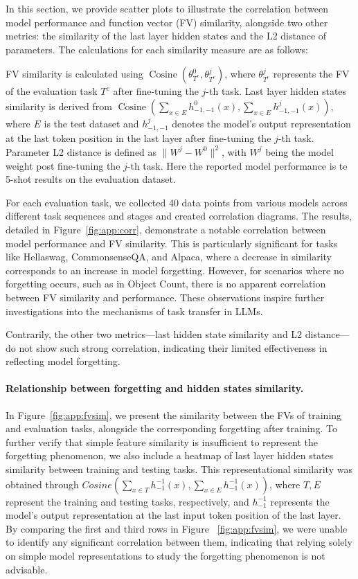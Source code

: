 In this section, we provide scatter plots to illustrate the correlation between model performance and function vector (FV) similarity, alongside two other metrics: the similarity of the last layer hidden states and the L2 distance of parameters. The calculations for each similarity measure are as follows:

FV similarity is calculated using \(\operatorname{Cosine}(\theta_{T^e}^0, \theta_{T^e}^j)\), where \(\theta_{T^e}^j\) represents the FV of the evaluation task \(T^e\) after fine-tuning the \(j\)-th task.
Last layer hidden states similarity is derived from \(\operatorname{Cosine}\left(\sum_{x \in E} h^0_{-1,-1}(x), \sum_{x \in E} h^j_{-1,-1}(x)\right)\), where \(E\) is the test dataset and \(h^j_{-1,-1}\) denotes the model's output representation at the last token position in the last layer after fine-tuning the \(j\)-th task.
Parameter L2 distance is defined as \(\|W^j - W^0\|^2\), with \(W^j\) being the model weight post fine-tuning the \(j\)-th task. Here the reported model performance is te 5-shot results on the evaluation dataset.

For each evaluation task, we collected 40 data points from various models across different task sequences and stages and created correlation diagrams. The results, detailed in Figure~\ref{fig:app:corr}, demonstrate a notable correlation between model performance and FV similarity. This is particularly significant for tasks like Hellaswag, CommonsenseQA, and Alpaca, where a decrease in similarity corresponds to an increase in model forgetting. However, for scenarios where no forgetting occurs, such as in Object Count, there is no apparent correlation between FV similarity and performance. These observations inspire further investigations into the mechanisms of task transfer in LLMs.

Contrarily, the other two metrics—last hidden state similarity and L2 distance—do not show such strong correlation, indicating their limited effectiveness in reflecting model forgetting.




\paragraph{Relationship between forgetting and hidden states similarity.}
\label{app:hidden_sim}
In Figure~\ref{fig:app:fvsim}, we present the similarity between the FVs of training and evaluation tasks, alongside the corresponding forgetting after training. 
To further verify that simple feature similarity is insufficient to represent the forgetting phenomenon, we also include a heatmap of last layer hidden states similarity between training and testing tasks. This representational similarity was obtained through $Cosine(\sum_{x \in T}h_{-1}^{-1}(x), \sum_{x \in E}h_{-1}^{-1}(x))$, where \(T, E\) represent the training and testing tasks, respectively, and \(h_{-1}^{-1}\) represents the model's output representation at the last input token position of the last layer. By comparing the first and third rows in Figure ~\ref{fig:app:fvsim}, we were unable to identify any significant correlation between them, indicating that relying solely on simple model representations to study the forgetting phenomenon is not advisable.


